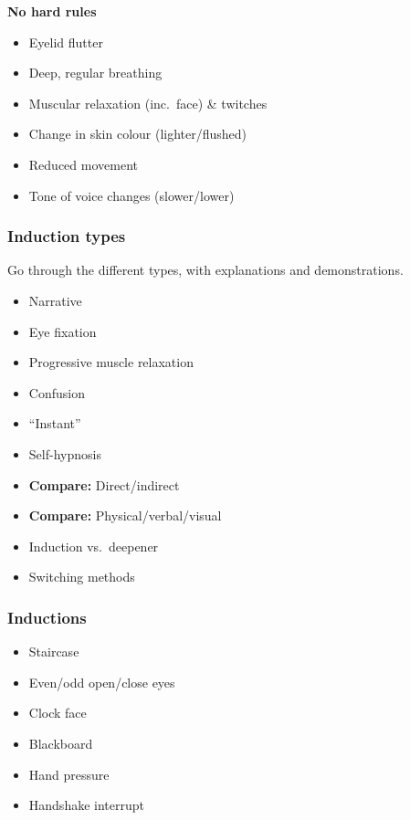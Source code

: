 \documentclass{dmistyle}
\begin{document}
\textbf{\color{red!50!black}No hard rules}

\begin{multicols}{2}
\begin{itemize}
	\item Eyelid flutter
	\item Deep, regular breathing
	\item Muscular relaxation (inc.\ face) \& twitches
	\item Change in skin colour (lighter/flushed)
	\item Reduced movement
	\item Tone of voice changes (slower/lower)
\end{itemize}
\end{multicols}

\subsubsection{Induction types}

Go through the different types, with explanations and demonstrations.

\begin{multicols}{2}
\begin{itemize}
	\item Narrative
	\item Eye fixation
	\item Progressive muscle relaxation
	\item Confusion
	\item ``Instant''
	\item Self-hypnosis
	\item \textbf{Compare:} Direct/indirect
	\item \textbf{Compare:} Physical/verbal/visual
	\item Induction vs.\ deepener
	\item Switching methods
\end{itemize}
\end{multicols}

\subsubsection{Inductions}

\begin{multicols}{3}
\begin{itemize}
	\item Staircase
	\item Even/odd open/close eyes
	\item Clock face
	\item Blackboard
	\item Hand pressure
	\item Handshake interrupt
\end{itemize}
\end{multicols}
\end{document}
